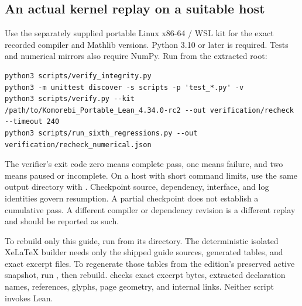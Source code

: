 \subsection{An actual kernel replay on a suitable host}
Use the separately supplied portable Linux x86-64 / WSL kit for the exact recorded compiler and Mathlib versions. Python 3.10 or later is required. Tests and numerical mirrors also require NumPy. Run from the extracted  root:
\begin{Verbatim}[fontsize=\small,breaklines=true,breakanywhere=true,frame=leftline]
python3 scripts/verify_integrity.py
python3 -m unittest discover -s scripts -p 'test_*.py' -v
python3 scripts/verify.py --kit /path/to/Komorebi_Portable_Lean_4.34.0-rc2 --out verification/recheck --timeout 240
python3 scripts/run_sixth_regressions.py --out verification/recheck_numerical.json
\end{Verbatim}
The verifier's exit code zero means complete pass, one means failure, and two means paused or incomplete. On a host with short command limits, use the same output directory with . Checkpoint source, dependency, interface, and log identities govern resumption. A partial checkpoint does not establish a cumulative pass. A different compiler or dependency revision is a different replay and should be reported as such.

To rebuild only this guide, run  from its directory. The deterministic isolated XeLaTeX builder needs only the shipped guide sources, generated tables, and exact excerpt files. To regenerate those tables from the edition's preserved active snapshot, run , then rebuild.  checks exact excerpt bytes, extracted declaration names, references, glyphs, page geometry, and internal links. Neither script invokes Lean.

